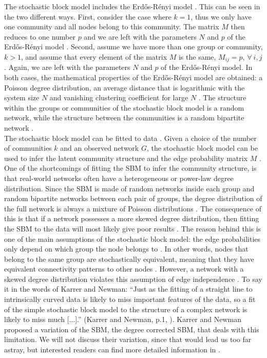 \documentclass[11 pt , letterpaper , twoside , openright]{book}
\begin{document}
The stochastic block model includes the Erd\H{o}s-R\'{e}nyi model \cite{Clauset2017}. This can be seen in the two different ways. First, consider the case where $k = 1$, thus we only have one community and all nodes belong to this community. The matrix $M$ then reduces to one number $p$ and we are left with the parameters $N$ and $p$ of the Erd\H{o}s-R\'{e}nyi model \cite{Clauset2017}. Second, assume we have more than one group or community, $k > 1$, and assume that every element of the matrix $M$ is the same, $M_{ij} = p$, $\forall \ i, j$ \cite{Clauset2017}. Again, we are left with the parameters $N$ and $p$ of the Erd\H{o}s-R\'{e}nyi model. In both cases, the mathematical properties of the Erd\H{o}s-R\'{e}nyi model are obtained: a Poisson degree distribution, an average distance that is logarithmic with the system size $N$ and vanishing clustering coefficient for large $N$ \cite{Clauset2017}. The structure within the groups or communities of the stochastic block model is a random network, while the structure between the communities is a random bipartite network \cite{Clauset2017}.\\
\newline
The stochastic block model can be fitted to data \cite{Clauset2017}. Given a choice of the number of communities $k$ and an observed network $G$, the stochastic block model can be used to infer the latent community structure and the edge probability matrix $M$ \cite{Clauset2017}. One of the shortcomings of fitting the SBM to infer the community structure, is that real-world networks often have a heterogeneous or power-law degree distribution. Since the SBM is made of random networks inside each group and random bipartite networks between each pair of groups, the degree distribution of the full network is always a mixture of Poisson distributions \cite{Clauset2017}. The consequence of this is that if a network possesses a more skewed degree distribution, then fitting the SBM to the data will most likely give poor results \cite{Karrer2011}. The reason behind this is one of the main assumptions of the stochastic block model: the edge probabilities only depend on which group the node belongs to \cite{Clauset2017}. In other words, nodes that belong to the same group are stochastically equivalent, meaning that they have equivalent connectivity patterns to other nodes \cite{Clauset2017}. However, a network with a skewed degree distribution violates this assumption of edge independence \cite{Clauset2017}. To say it in the words of Karrer and Newman: ``Just as the fitting of a straight line to intrinsically curved data is likely to miss important features of the data, so a fit of the simple stochastic block model to the structure of a complex network is likely to miss much [...].'' (Karrer and Newman, p.1, \cite{Karrer2011}). Karrer and Newman proposed a variation of the SBM, the degree corrected SBM, that deals with this limitation. We will not discuss their variation, since that would lead us too far astray, but interested readers can find more detailed information in \cite{Karrer2011}. \\
\end{document}
